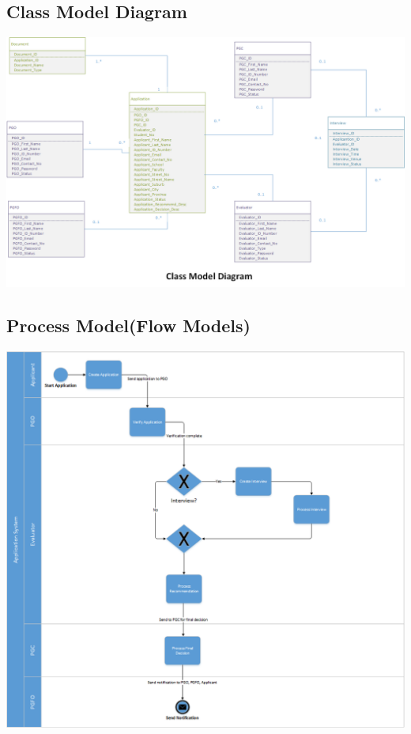 \documentclass{article}
\begin{document}
\subsection{Class Model Diagram}
\includegraphics[scale=0.5]{ERD.png} \\
\subsection{Process Model(Flow Models)}
\includegraphics[scale=0.6]{ApplicationSystemFlow.png} \\ 
\end{document}
